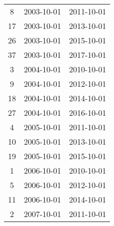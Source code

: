 \begin{tabular}{ccc}
  8 & 2003-10-01 & 2011-10-01 \\ 
  17 & 2003-10-01 & 2013-10-01 \\ 
  26 & 2003-10-01 & 2015-10-01 \\ 
  37 & 2003-10-01 & 2017-10-01 \\ 
  3 & 2004-10-01 & 2010-10-01 \\ 
  9 & 2004-10-01 & 2012-10-01 \\ 
  18 & 2004-10-01 & 2014-10-01 \\ 
  27 & 2004-10-01 & 2016-10-01 \\ 
  4 & 2005-10-01 & 2011-10-01 \\ 
  10 & 2005-10-01 & 2013-10-01 \\ 
  19 & 2005-10-01 & 2015-10-01 \\ 
  1 & 2006-10-01 & 2010-10-01 \\ 
  5 & 2006-10-01 & 2012-10-01 \\ 
  11 & 2006-10-01 & 2014-10-01 \\ 
  2 & 2007-10-01 & 2011-10-01 \\ 
   \hline
\end{tabular}
